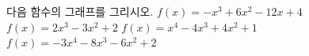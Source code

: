 다음 함수의 그래프를 그리시오.
 $f(x)=-x^3+6x^2-12x+4$
 $f(x)=2x^3-3x^2+2$
 $f(x)=x^4-4x^3+4x^2+1$
 $f(x)=-3x^4-8x^3-6x^2+2$
